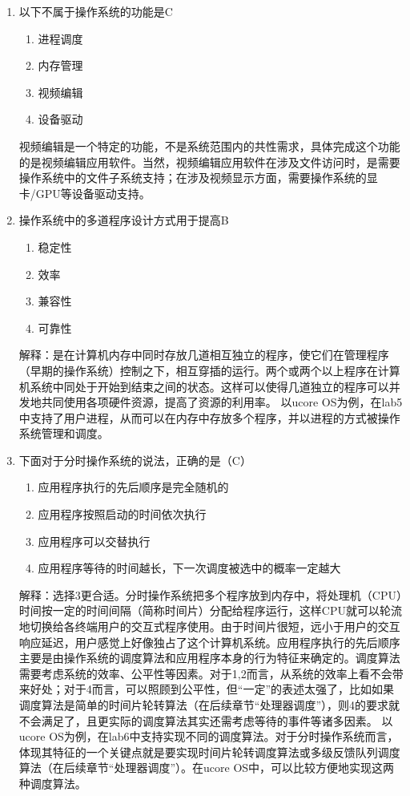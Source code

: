 \begin{enumerate}
\item 以下不属于操作系统的功能是C
\begin{enumerate}[A]
	\item 
	进程调度
	\item 内存管理
	\item 视频编辑
	\item 设备驱动
\end{enumerate}
视频编辑是一个特定的功能，不是系统范围内的共性需求，具体完成这个功能的是视频编辑应用软件。当然，视频编辑应用软件在涉及文件访问时，是需要操作系统中的文件子系统支持；在涉及视频显示方面，需要操作系统的显卡/GPU等设备驱动支持。
\item 操作系统中的多道程序设计方式用于提高B
\begin{enumerate}[A]
	\item 
	稳定性
	\item 
	效率 
	\item 
	兼容性
	\item 
	可靠性
\end{enumerate}
解释：是在计算机内存中同时存放几道相互独立的程序，使它们在管理程序（早期的操作系统）控制之下，相互穿插的运行。两个或两个以上程序在计算机系统中同处于开始到结束之间的状态。这样可以使得几道独立的程序可以并发地共同使用各项硬件资源，提高了资源的利用率。 以ucore OS为例，在lab5中支持了用户进程，从而可以在内存中存放多个程序，并以进程的方式被操作系统管理和调度。
\item 下面对于分时操作系统的说法，正确的是（C）
\begin{enumerate}[A]
	\item 
	应用程序执行的先后顺序是完全随机的
	\item 
	应用程序按照启动的时间依次执行
	\item 
	应用程序可以交替执行 
	\item  应用程序等待的时间越长，下一次调度被选中的概率一定越大 
\end{enumerate}
解释：选择3更合适。分时操作系统把多个程序放到内存中，将处理机（CPU）时间按一定的时间间隔（简称时间片）分配给程序运行，这样CPU就可以轮流地切换给各终端用户的交互式程序使用。由于时间片很短，远小于用户的交互响应延迟，用户感觉上好像独占了这个计算机系统。应用程序执行的先后顺序主要是由操作系统的调度算法和应用程序本身的行为特征来确定的。调度算法需要考虑系统的效率、公平性等因素。对于1,2而言，从系统的效率上看不会带来好处；对于4而言，可以照顾到公平性，但“一定”的表述太强了，比如如果调度算法是简单的时间片轮转算法（在后续章节“处理器调度”），则4的要求就不会满足了，且更实际的调度算法其实还需考虑等待的事件等诸多因素。 以ucore OS为例，在lab6中支持实现不同的调度算法。对于分时操作系统而言，体现其特征的一个关键点就是要实现时间片轮转调度算法或多级反馈队列调度算法（在后续章节“处理器调度”）。在ucore OS中，可以比较方便地实现这两种调度算法。

\end{enumerate}
